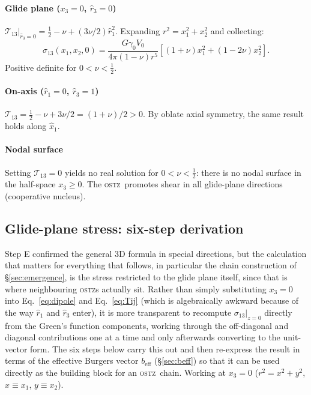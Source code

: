 \documentclass[3p]{elsarticle}
\newcommand{\OSTZ}{\textsc{ostz}}
\newcommand{\gz}{\gamma_0}
\newcommand{\beff}{b_\mathrm{eff}}
\newcommand{\half}{\tfrac{1}{2}}
\begin{document}
\paragraph{Glide plane ($x_3=0$, $\hat r_3=0$)}
$\mathcal T_{13}|_{\hat r_3=0}=\half-\nu+(3\nu/2)\hat r_1^2$.
Expanding $r^2=x_1^2+x_2^2$ and collecting:
\begin{equation}
  \sigma_{13}(x_1,x_2,0)=\frac{G\gz V_0}{4\pi(1-\nu)r^5}
  [(1+\nu)x_1^2+(1-2\nu)x_2^2].
  \label{eq:glidecheck}
\end{equation}
Positive definite for $0<\nu<\half$.

\paragraph{On-axis ($\hat r_1=0$, $\hat r_3=1$)}
$\mathcal T_{13}=\half-\nu+3\nu/2=(1+\nu)/2>0$. By oblate axial
symmetry, the same result holds along $\hat x_1$.

\paragraph{Nodal surface}
Setting $\mathcal T_{13}=0$ yields no real solution for
$0<\nu<\half$: there is no nodal surface in the half-space
$x_3\ge0$. The \OSTZ\ promotes shear in all glide-plane directions
(cooperative nucleus).

\subsection{Glide-plane stress: six-step derivation}
\label{sec:glideplane}

Step E confirmed the general 3D formula in special directions, but
the calculation that matters for everything that follows, in
particular the chain construction of \S\ref{sec:emergence}, is the
stress restricted to the glide plane itself, since that is where
neighbouring \OSTZ s actually sit. Rather than simply substituting
$x_3=0$ into Eq.~\eqref{eq:dipole} and Eq.~\eqref{eq:Tij} (which is
algebraically awkward because of the way $\hat r_1$ and $\hat r_3$
enter), it is more transparent to recompute $\sigma_{13}|_{z=0}$
directly from the Green's function components, working through the
off-diagonal and diagonal contributions one at a time and only
afterwards converting to the unit-vector form. The six steps below
carry this out and then re-express the result in terms of the
effective Burgers vector $\beff$ (\S\ref{sec:beff}) so that it can be
used directly as the building block for an \OSTZ\ chain.
Working at $x_3=0$ ($r^2=x^2+y^2$, $x\equiv x_1$, $y\equiv x_2$).
\end{document}
